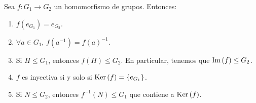 \begin{prop}
Sea $\displaystyle f : G_{1} \to G_{2} $ un homomorfismo de grupos. Entonces:
\begin{enumerate}
\item $\displaystyle f\left(e_{G_{1}}\right) = e_{G_{2}} $.
\item $\displaystyle \forall a \in G_{1} $, $\displaystyle f\left(a^{-1}\right) = f\left(a\right)^{-1} $.
\item Si $\displaystyle H \leq G_{1} $, entonces $\displaystyle f\left(H\right) \leq G_{2} $. En particular, tenemos que $\displaystyle \operatorname{Im}\left(f\right) \leq G_{2} $.
\item $\displaystyle f $ es inyectiva si y solo si $\displaystyle \operatorname{Ker}\left(f\right) = \left\{ e_{G_{1}}\right\}  $.
\item Si $\displaystyle N \leq G_{2} $, entonces $\displaystyle f^{-1}\left(N\right) \leq G_{1} $ que contiene a $\displaystyle \operatorname{Ker}\left(f\right) $.
\end{enumerate}
\end{prop}
